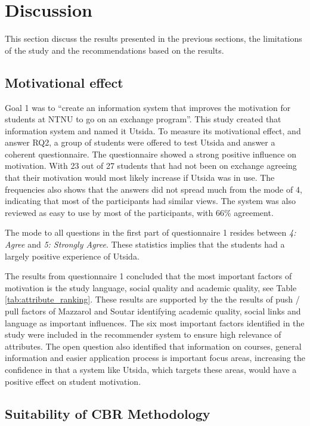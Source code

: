 \section{Discussion}

This section discuss the results presented in the previous sections, the limitations of the study and the recommendations based on the results. 

\subsection{Motivational effect}

Goal 1 was to \enquote{create an information system that improves the motivation for students at NTNU to go on an exchange program}. This study created that information system and named it Utsida. To measure its motivational effect, and answer RQ2, a group of students were offered to test Utsida and answer a coherent questionnaire. The questionnaire showed a strong positive influence on motivation. With 23 out of 27 students that had not been on exchange agreeing that their motivation would most likely increase if Utsida was in use. The frequencies also shows that the answers did not spread much from the mode of 4, indicating that most of the participants had similar views. The system was also reviewed as easy to use by most of the participants, with 66\% agreement.

The mode to all questions in the first part of questionnaire 1 resides between \textit{4: Agree} and \textit{5: Strongly Agree}. These statistics implies that the students had a largely positive experience of Utsida.




The results from questionnaire 1 concluded that the most important factors of motivation is the study language, social quality and academic quality, see Table \ref{tab:attribute_ranking}. These results are supported by the the results of push / pull factors of Mazzarol and Soutar \cite{mazzarol2002push} identifying academic quality, social links and language as important influences. The six most important factors identified in the study were included in the recommender system to ensure high relevance of attributes. The open question also identified that information on courses, general information and easier application process is important focus areas, increasing the confidence in that a system like Utsida, which targets these areas, would have a positive effect on student motivation.

\subsection{Suitability of CBR Methodology}

